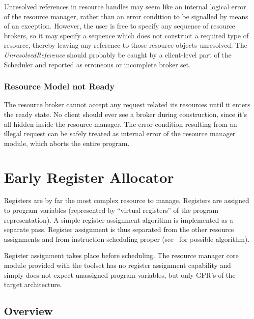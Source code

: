 \documentclass[a4paper,twoside]{tce}
\begin{document}
Unresolved references in resource handles may seem like an internal logical
error of the resource manager, rather than an error condition to be
signalled by means of an exception.
%
However, the user is free to specify any sequence of resource brokers, so it
may specify a sequence which does not construct a required type of resource,
thereby leaving any reference to those resource objects unresolved. The
\emph{UnresolvedReference} should probably be caught by a client-level part
of the Scheduler and reported as erroneous or incomplete broker set.

\subsection{Resource Model not Ready}

The resource broker cannot accept any request related its resources until it
enters the ready state. No client should ever see a broker during
construction, since it's all hidden inside the resource manager.
%
%
The error condition resulting from an illegal request can be safely treated
as internal error of the resource manager module, which aborts the entire
program.



\chapter{Early Register Allocator}
\label{ch:EarlyRegisterAllocator}

Registers are by far the most complex resource to manage. Registers are
assigned to program variables (represented by ``virtual registers'' of the
program representation).
%
A simple register assignment algorithm is implemented as a
separate pass. Register assignment is thus separated from
the other resource assignments and from instruction scheduling proper
(see~\cite{Norris94} for possible algorithm).
%

Register assignment takes place before scheduling. The resource manager core
module provided with the toolset has no register assignment capability and
simply does not expect unassigned program variables, but only GPR's of the
target architecture.

\section{Overview}
\end{document}

